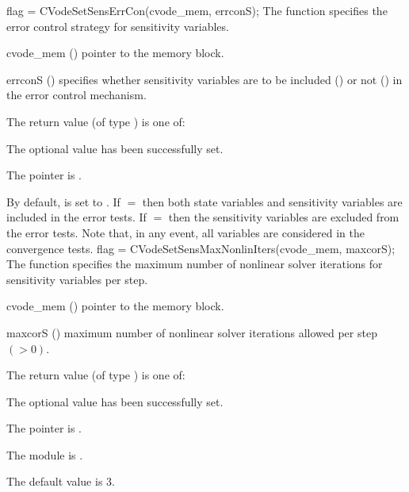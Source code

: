 {
  flag = CVodeSetSensErrCon(cvode\_mem, errconS);
}
{
  The function  specifies the error control
  strategy for sensitivity variables.
}
{
  \begin{args}
  \item[cvode\_mem] ()
    pointer to the {\cvodes} memory block.
  \item[errconS] ()
    specifies whether sensitivity variables are to be included () or not
    () in the error control mechanism.
  \end{args}
}
{
  The return value  (of type ) is one of:
  \begin{args}
  \item[\Id{CV\_SUCCESS}] 
    The optional value has been successfully set.
  \item[\Id{CV\_MEM\_NULL}]
    The  pointer is .
  \end{args}
}
{
  By default,  is set to . 
  If $=$ then both state variables and
  sensitivity variables are included in the error tests. 
  If $=$ then the sensitivity variables are excluded from the 
  error tests. Note that, in any event, all variables are considered in the convergence 
  tests.
}
{
  flag = CVodeSetSensMaxNonlinIters(cvode\_mem, maxcorS);
}
{
  The function  specifies the maximum
  number of nonlinear solver iterations for sensitivity variables per step.
}
{
  \begin{args}
  \item[cvode\_mem] ()
    pointer to the {\cvodes} memory block.
  \item[maxcorS] ()
    maximum number of nonlinear solver iterations allowed per step $(> 0)$.
  \end{args}
}
{
  The return value  (of type ) is one of:
  \begin{args}
  \item[\Id{CV\_SUCCESS}] 
    The optional value has been successfully set.
  \item[\Id{CV\_MEM\_NULL}]
    The  pointer is .
  \item[\Id{CV\_MEM\_FAIL}]
    The {\sunnonlinsol} module is .
  \end{args}
}
{
  The default value is $3$.
}

